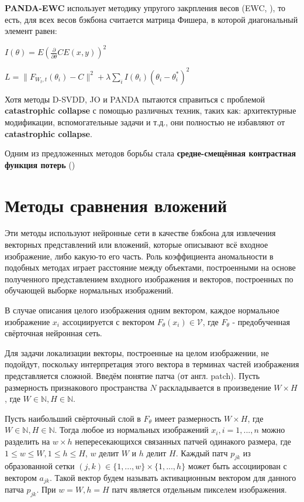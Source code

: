 \documentclass{article}
\begin{document}
\begin{large}
\textbf{PANDA-EWC} использует методику упругого закрпления весов (EWC, \cite{ewc}), то есть, для всех весов бэкбона считается матрица Фишера, в которой диагональный элемент равен:
\begin{center}
	$I(\theta) = E (\frac{\partial}{\partial \theta}CE(x, y))^2$
\end{center}

\begin{center}
	$L = \| F_{W_t, t}(\theta_i) - C \|^2 + \lambda \sum\limits_{i} I(\theta_i)(\theta_i - \theta^*_i)^2$
\end{center}

Хотя методы D-SVDD, JO и PANDA пытаются справиться с проблемой \textbf{catastrophic collapse} с помощью различных техник, таких как: архитектурные модификации, вспомогательные задачи и т.д., они полностью не избавляют от \textbf{catastrophic collapse}.

Одним из предложенных методов борьбы стала \textbf{средне-смещённая контрастная функция потерь} (\cite{classical_nn_loss}) 


\section{Методы сравнения вложений}

Эти методы используют нейронные сети в качестве бэкбона для извлечения векторных представлений или вложений, которые описывают всё входное изображение, либо какую-то его часть. Роль коэффициента аномальности в подобных методах играет расстояние между объектами, построенными на основе полученного представлением входного изображения и векторов, построенных по обучающей выборке нормальных изображений.

В случае описания целого изображения одним вектором, каждое нормальное изображение $x_i$ ассоциируется с вектором $F_\theta(x_i) \in \mathcal{V}$, где $F_\theta$ - предобученная свёрточная нейронная сеть.

Для задачи локализации векторы, построенные на целом изображении, не подойдут, поскольку интерпретация этого вектора в терминах частей изображения представляется сложной. Введём понятие патча (от англ. patch). Пусть размерность признакового пространства $N$ раскладывается в произведение $W \times H$, где $W \in \mathbb{N}, H \in \mathbb{N}$.

Пусть наибольший свёрточный слой в $F_\theta$ имеет размерность $W \times H$, где $W \in \mathbb{N}, H \in \mathbb{N}$. Тогда любое из нормальных изображений $x_i, i = 1,...,n$ можно разделить на $w \times h$ непересекающихся связанных патчей одинакого размера, где $1 \le w \le W, 1 \le h \le H$, $w$ делит $W$ и $h$ делит $H$. Каждый патч $p_{jk}$ из образованной сетки $(j, k) \in \{1,...,w\} \times \{1,...,h\}$ может быть ассоциирован с вектором $a_{jk}$. Такой вектор будем называть активационным вектором для данного патча $p_{jk}$. При $w = W, h = H$ патч является отдельным пикселем изображения.


\end{large}
\end{document}
